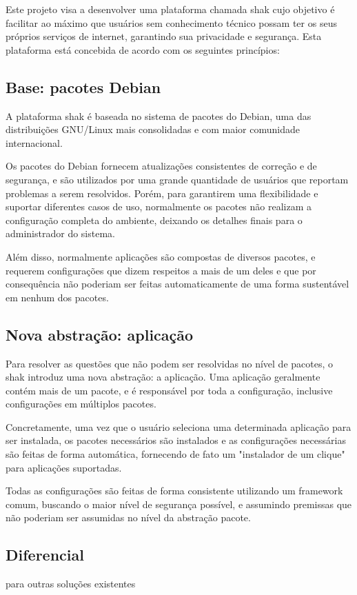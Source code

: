 \begin{anexosenv}
Este projeto visa a desenvolver uma plataforma chamada shak cujo objetivo é
facilitar ao máximo que usuários sem conhecimento técnico possam ter os seus
próprios serviços de internet, garantindo sua privacidade e segurança. Esta
plataforma está concebida de acordo com os seguintes princípios:

\subsection{Base: pacotes Debian}

A plataforma shak é baseada no sistema de pacotes do Debian, uma das
distribuições GNU/Linux mais consolidadas e com maior comunidade internacional.

Os pacotes do Debian fornecem atualizações consistentes de correção e de
segurança, e são utilizados por uma grande quantidade de usuários que
reportam problemas a serem resolvidos. Porém, para garantirem uma
flexibilidade e suportar diferentes casos de uso, normalmente os pacotes não
realizam a configuração completa do ambiente, deixando os detalhes finais
para o administrador do sistema.

Além disso, normalmente aplicações são compostas de diversos pacotes, e
requerem configurações que dizem respeitos a mais de um deles e que por
consequência não poderiam ser feitas automaticamente de uma forma sustentável
em nenhum dos pacotes.

\subsection{Nova abstração: aplicação}

Para resolver as questões que não podem ser resolvidas no nível de pacotes, o
shak introduz uma nova abstração: a aplicação. Uma aplicação geralmente
contém mais de um pacote, e é responsável por toda a configuração, inclusive
configurações em múltiplos pacotes.

Concretamente, uma vez que o usuário seleciona uma determinada aplicação para
ser instalada, os pacotes necessários são instalados e as configurações
necessárias são feitas de forma automática, fornecendo de fato um "instalador
de um clique" para aplicações suportadas.

Todas as configurações são feitas de forma consistente utilizando um framework
comum, buscando o maior nível de segurança possível, e assumindo premissas que
não poderiam ser assumidas no nível da abstração pacote.

\subsection{Diferencial} para outras soluções existentes


\end{anexosenv}
